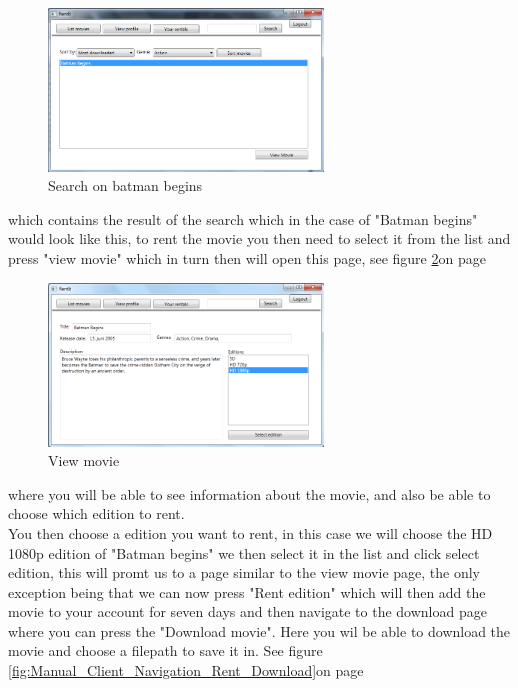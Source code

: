 \begin{figure}[h!]
\caption{Search on batman begins}
\label{fig:Manual_Client_Navigation_Rent_Search}
  \centering
\includegraphics[width=0.65\textwidth]{Parts/Images/Manual/Search}
\end{figure}
 
which contains the result of the search which in the case of "Batman begins" would look like this, to rent the movie you then need to select it from the list and press "view movie" which in turn then will open this page, see figure \ref{fig:Manual_Client_Navigation_Rent_View}on page \pageref{fig:Manual_Client_Navigation_Rent_View}


\begin{figure}[h!]  
\caption{View movie}
\label{fig:Manual_Client_Navigation_Rent_View}
  \centering
\includegraphics[width=0.65\textwidth]{Parts/Images/Manual/Viewmovie}
\end{figure}
 
 where you will be able to see information about the movie, and also be able to choose which edition to rent.
\\ You then choose a edition you want to rent, in this case we will choose the HD 1080p edition of "Batman begins" we then select it in the list and click select edition, this will promt us to a page similar to the view movie page, the only exception being that we can now press "Rent edition" which will then add the movie to your account for seven days and then navigate to the download page where you can press the "Download movie". Here you wil be able to download the movie and choose a filepath to save it in. See figure \ref{fig:Manual_Client_Navigation_Rent_Download}on page \pageref{fig:Manual_Client_Navigation_Rent_Download}



